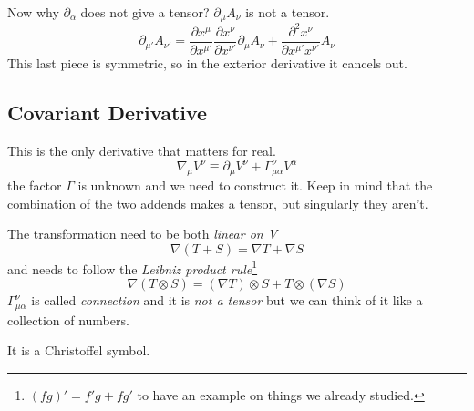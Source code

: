 Now why $\partial_{\alpha }$ does not give a tensor? $\partial_{\mu }A_{\nu }$ is not a tensor.
\[
	\partial_{\mu '}A_{\nu '} = \frac{\partial x^{\mu }}{\partial x^{\mu '}} \frac{\partial x^{\nu }}{\partial x^{\nu '}} \partial_{\mu } A_{\nu } + \frac{\partial^{2}x^{\nu }}{\partial x^{\mu '}x^{\nu '}} A_{\nu }
\]
This last piece is symmetric, so in the exterior derivative it cancels out.\par

\subsection{Covariant Derivative} \label{sec:covder}

This is the only derivative that matters for real.
\[
\nabla_{\mu }V^{\nu } \equiv \partial_{\mu }V^{\nu } + \Gamma ^{\nu }_{\mu \alpha }V^{\alpha }		
\]
the factor $\Gamma $ is unknown and we need to construct it. Keep in mind that the combination of the two addends makes a tensor, but singularly they aren't.

The transformation need to be both \emph{linear on V}
\[
\nabla \left( T+S \right) = \nabla T + \nabla S
\]
and needs to follow the \emph{Leibniz product rule}\footnote{ $\left( fg \right)' = f'g + fg'$ to have an example on things we already studied.}
\[
\nabla \left( T \otimes S \right) = \left( \nabla T \right) \otimes S + T \otimes \left( \nabla S \right)
\]
$\Gamma^{\nu }_{\mu \alpha }$ is called \emph{connection} and it is \emph{not a tensor} but we can think of it like a collection of numbers. \par
It is a Christoffel symbol.\par

